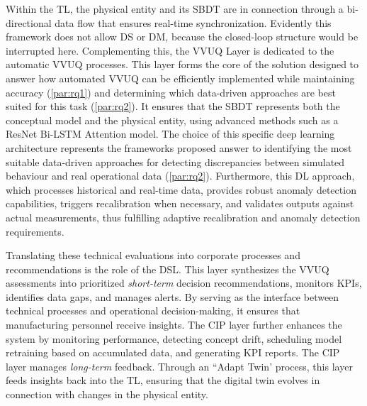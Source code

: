 Within the TL, the physical entity and its SBDT are in connection through a bi-directional data flow that ensures real-time synchronization. Evidently this framework does not allow DS or DM, because the closed-loop structure would be interrupted here. Complementing this, the VVUQ Layer is dedicated to the automatic VVUQ processes. This layer forms the core of the solution designed to answer how automated VVUQ can be efficiently implemented while maintaining accuracy (\autoref{par:rq1}) and determining which data-driven approaches are best suited for this task (\autoref{par:rq2}). It ensures that the SBDT represents both the conceptual model and the physical entity, using advanced methods such as a ResNet Bi-LSTM Attention model. The choice of this specific deep learning architecture represents the frameworks proposed answer to identifying the most suitable data-driven approaches for detecting discrepancies between simulated behaviour and real operational data (\autoref{par:rq2}). Furthermore, this DL approach, which processes historical and real-time data, provides robust anomaly detection capabilities, triggers recalibration when necessary, and validates outputs against actual measurements, thus fulfilling adaptive recalibration and anomaly detection requirements.

Translating these technical evaluations into corporate processes and recommendations is the role of the DSL. This layer synthesizes the VVUQ assessments into prioritized \textit{short-term} decision recommendations, monitors KPIs, identifies data gaps, and manages alerts. By serving as the interface between technical processes and operational decision-making, it ensures that manufacturing personnel receive insights. The CIP layer further enhances the system by monitoring performance, detecting concept drift, scheduling model retraining based on accumulated data, and generating KPI reports. The CIP layer manages \textit{long-term} feedback. Through an ``Adapt Twin' process, this layer feeds insights back into the TL, ensuring that the digital twin evolves in connection with changes in the physical entity.

